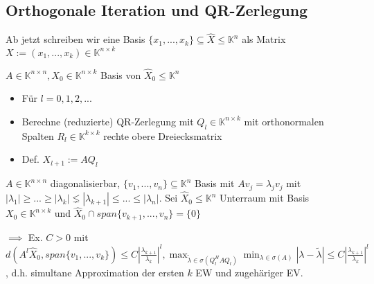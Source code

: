 \subsection{Orthogonale Iteration und QR-Zerlegung}

\begin{remark}
	Ab jetzt schreiben wir eine Basis $\{x_1, ..., x_k\} \subseteq \hat{X} \leq \mathbb{K}^n$ als Matrix $X:=(x_1, ..., x_k) \in \mathbb{K}^{n\times k}$
\end{remark}

\begin{algorithm}
	$A \in \mathbb{K}^{n\times n}, X_0 \in \mathbb{K}^{n\times k}$ Basis von $\hat{X}_0 \leq \mathbb{K}^n$
	\begin{itemize}
		\item Für $l=0,1,2,...$
		\item \hspace{0.5cm} Berechne (reduzierte) QR-Zerlegung mit $Q_l \in \mathbb{K}^{n\times k}$ mit orthonormalen Spalten $R_l \in \mathbb{K}^{k\times k}$ rechte obere Dreiecksmatrix
		\item Def. $X_{l+1} := AQ_l$
	\end{itemize}
\end{algorithm}

\begin{theorem}
	$A \in \mathbb{K}^{n\times n}$ diagonalisierbar, $\{v_1, ..., v_n\} \subseteq \mathbb{K}^n$ Basis mit $Av_j = \lambda_j v_j$ mit $|\lambda_1| \geq ... \geq |\lambda_k| \lneq |\lambda_{k+1}| \leq ... \leq |\lambda_n|$. Sei $\hat{X}_0 \leq \mathbb{K}^n$ Unterraum mit Basis $X_0 \in \mathbb{K}^{n\times k}$ und $\hat{X}_0 \cap span\{v_{k+1}, ..., v_n\} = \{0\}$
	
	$\implies$ Ex. $C>0$ mit $d(A^l\hat{X}_0, span\{v_1, ..., v_k\}) \leq C \left|\frac{\lambda_{k+1}}{\lambda_k}\right|^l, \max_{\tilde{\lambda} \in \sigma(Q_l^HAQ_l)} \min_{\lambda \in \sigma(A)} |\lambda - \tilde{\lambda}| \leq C \left|\frac{\lambda_{k+1}}{\lambda_k}\right|^l$, d.h. simultane Approximation der ersten $k$ EW und zugehäriger EV.
\end{theorem}

